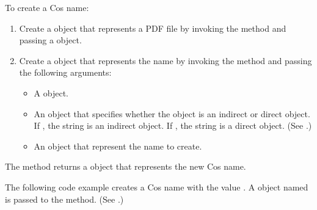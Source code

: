 \documentclass[letterpaper,12pt,english,openany,oneside]{sphinxmanual}
\begin{document}
To create a Cos name:
\begin{enumerate}
%
\item {} 
Create a  object that represents a PDF file by invoking the  method and passing a  object.

\item {} 
Create a  object that represents the name by invoking the  method and passing the following arguments:
\begin{itemize}
\item {} 
A  object.

\item {} 
An  object that specifies whether the  object is an indirect or direct object. If , the string is an indirect object. If , the string is a direct object. (See .)

\item {} 
An  object that represent the name to create.

\end{itemize}

\end{enumerate}

The  method returns a  object that represents the new Cos name.

The following code example creates a Cos name with the value . A  object named  is passed to the  method. (See .)

\begin{sphinxVerbatim}[commandchars=\\\{\}]
   
 
   
    
\end{sphinxVerbatim}
\end{document}
